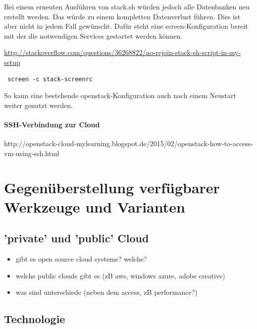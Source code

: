 \documentclass[a4paper,10pt]{article}
\begin{document}
Bei einem erneuten Ausführen von stack.sh würden jedoch alle Datenbanken neu erstellt werden.
Das würde zu einem kompletten Datenverlust führen.
Dies ist aber nicht in jedem Fall gewünscht.
Dafür steht eine screen-Konfiguration bereit mit der die notwendigen Services gestartet werden können.

\url{http://stackoverflow.com/questions/36268822/no-rejoin-stack-sh-script-in-my-setup}

\begin{verbatim}
 screen -c stack-screenrc
\end{verbatim}

So kann eine bestehende openstack-Konfiguration auch nach einem Neustart weiter genutzt werden.

\paragraph{SSH-Verbindung zur Cloud}

http://openstack-cloud-mylearning.blogspot.de/2015/02/openstack-how-to-access-vm-using-ssh.html

\newpage













\section{Gegenüberstellung verfügbarer Werkzeuge und Varianten}

\subsection{'private' und 'public' Cloud}

\begin{itemize}
 \item gibt es open source cloud systeme? welche?
 \item welche public clouds gibt es (zB aws, windows azure, adobe creative)
 \item was sind unterschiede (neben dem access, zB performance?)
\end{itemize}

\subsection{Technologie}
\end{document}
